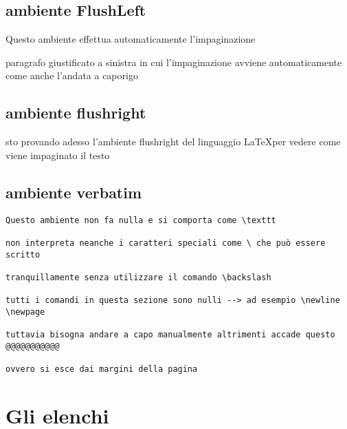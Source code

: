 \documentclass{article}
\begin{document}
\newpage

\subsection{ambiente FlushLeft}

Questo ambiente effettua automaticamente l'impaginazione

\begin{flushleft}
paragrafo giustificato a sinistra in cui l'impaginazione avviene automaticamente come anche l'andata a caporigo
\end{flushleft}

\subsection{ambiente flushright}

\begin{flushright}
sto provando adesso l'ambiente flushright del linguaggio \LaTeX per vedere come viene impaginato il testo
\end{flushright}

\subsection{ambiente verbatim}

\begin{verbatim}
Questo ambiente non fa nulla e si comporta come \texttt

non interpreta neanche i caratteri speciali come \ che può essere scritto

tranquillamente senza utilizzare il comando \backslash

tutti i comandi in questa sezione sono nulli --> ad esempio \newline \newpage

tuttavia bisogna andare a capo manualmente altrimenti accade questo @@@@@@@@@@@

ovvero si esce dai margini della pagina
\end{verbatim}

\newpage










\section{Gli elenchi}
\end{document}
